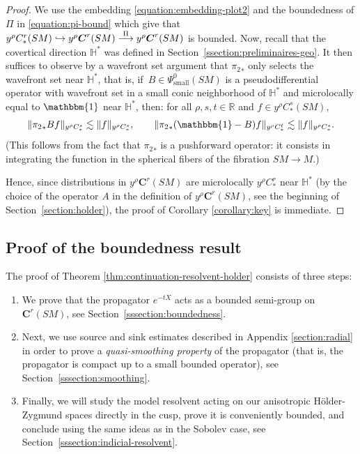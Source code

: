 \documentclass[10pt]{amsart}
\newcommand\hto{\mathrel{\lhook\joinrel\to}}
\newcommand{\bC}{\boldsymbol{C}}
\newcommand{\R}{\mathbb{R}}
\newcommand{\HH}{\mathbb{H}}
\theoremstyle{plain}
\theoremstyle{definition}
\begin{document}
\begin{proof}
We use the embedding \eqref{equation:embedding-plot2} and the boundedness of $\Pi$ in \eqref{equation:pi-bound} which give that $y^\rho C^r_*(SM) \hto y^\rho \bC^r(SM) \overset{\Pi}{\longrightarrow} y^\rho \bC^r(SM)$ is bounded. Now, recall that the covertical direction $\HH^*$ was defined in Section~\ref{ssection:preliminaires-geo}. It then suffices to observe by a wavefront set argument that ${\pi_2}_*$ only selects the wavefront set near $\HH^*$, that is, if~$B \in \Psi^0_{\mathrm{small}}(SM)$ is a pseudodifferential operator with wavefront set in a small conic neighborhood of $\HH^*$ and microlocally equal to $\mathbbm{1}$ near $\HH^*$, then: for all $\rho, s, t \in \R$ and $f \in y^\rho C^s_*(SM)$,
\begin{equation}
\label{equation:smoothing-integration}
\|{\pi_2}_*Bf\|_{y^\rho C^s_*} \lesssim \|f\|_{y^\rho C^s_*}, \qquad \|{\pi_2}_*(\mathbbm{1}-B)f\|_{y^\rho C^t_*} \lesssim \|f\|_{y^\rho C^{s}_*}.
\end{equation}
{\color{black}(This follows from the fact that ${\pi_2}_*$ is a pushforward operator: it consists in integrating the function in the spherical fibers of the fibration $SM \to M$.)}

Hence, since distributions in $y^\rho \bC^r(SM)$ are microlocally $y^\rho C^r_*$ near $\HH^*$ (by the choice of the operator $A$ in the definition of $y^\rho \bC^r(SM)$, see the beginning of Section~\ref{section:holder}), the proof of Corollary \ref{corollary:key} is immediate.
\end{proof}

\subsection{Proof of the boundedness result}

\label{ssection:proof-holder}

The proof of Theorem \ref{thm:continuation-resolvent-holder} consists of three steps:
\begin{enumerate}
\item We prove that the propagator $e^{-tX}$ acts as a bounded semi-group on $\bC^r(SM)$, see Section~\ref{sssection:boundedness}.
\item Next, we use source and sink estimates described in Appendix \ref{section:radial} in order to prove a \emph{quasi-smoothing property} of the propagator (that is, the propagator is compact up to a small bounded operator), see Section~\ref{sssection:smoothing}.
\item Finally, we will study the model resolvent acting on our anisotropic H\"older-Zygmund spaces directly in the cusp, prove it is conveniently bounded, and conclude using the same ideas as in the Sobolev case, see Section~\ref{sssection:indicial-resolvent}.
\end{enumerate}
\end{document}
